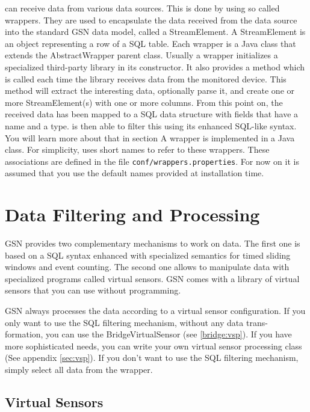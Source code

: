 \gsn can receive data from various data sources. This is done by using so called
wrappers. They are used to encapsulate the data received from the data source
into the standard GSN data model, called a StreamElement. A StreamElement
is an object representing a row of a SQL table.
Each wrapper is a Java class that extends the AbstractWrapper parent class.
Usually a wrapper initializes a specialized third-party library in its constructor.
It also provides a method which is called each time the library receives data from
the monitored device. This method will extract the interesting data, optionally
parse it, and create one or more StreamElement(s) with one or more columns.
From this point on, the received data has been mapped to a SQL data structure
with fields that have a name and a type. \gsn is then able to filter this using
its enhanced SQL-like syntax. You will learn more about that in section 
A wrapper is implemented in a Java class. For simplicity, \gsn uses short
names to refer to these wrappers. These associations are defined in the file
\texttt{conf/wrappers.properties}. For now on it is assumed that you use the default
names provided at installation time.

\section{Data Filtering and Processing}

GSN provides two complementary mechanisms to work on data.
The first one is based on a SQL syntax enhanced with specialized semantics
for timed sliding windows and event counting.
The second one allows to manipulate data with specialized programs called
virtual sensors. GSN comes with a library of virtual sensors that you can use
without programming. 

GSN always processes the data according to a virtual sensor configuration.
If you only want to use the SQL filtering mechanism, without any data trans-
formation, you can use the BridgeVirtualSensor (see \ref{bridge:vsp}).
If you have more sophisticated needs, you can write your
own virtual sensor processing class (See appendix \ref{sec:vsp}).  If you don't want to use the SQL filtering mechanism, simply select all data
from the wrapper.

\subsection{Virtual Sensors}

